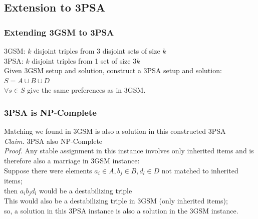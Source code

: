 \documentclass[mathserif,serif]{beamer}
\begin{document}


\subsection{Extension to 3PSA}

\begin{frame}
	\frametitle{Extending 3GSM to 3PSA}

	3GSM: $k$ disjoint triples from 3 disjoint sets of size $k$ \\
	3PSA: $k$ disjoint triples from 1 set of size $3k$\\
	\newline
	Given 3GSM setup and solution, construct a 3PSA setup and solution: \\
		$S = A \cup B \cup D$\\
		$\forall s \in S$ give the same preferences as in 3GSM.\\

\end{frame}

\begin{frame}
	\frametitle{3PSA is NP-Complete} 
		Matching we found in 3GSM is also a solution in this constructed 3PSA \\
		\newline
		\emph{Claim.} 3PSA also NP-Complete\\
		\emph{Proof.} Any stable assignment in this instance involves only inherited items and is
		therefore also a marriage in 3GSM instance: \\
		Suppose there were elements $a_i \in A, b_j \in B, d_l \in D$ not matched to inherited items;\\
		then $a_i b_j d_l$ would be a destabilizing triple\\ %
		
		This would also be a destabilizing triple in 3GSM (only inherited items);\\
		so, a solution in this 3PSA instance is also a solution in the 3GSM instance. \\

\end{frame}
\end{document}

